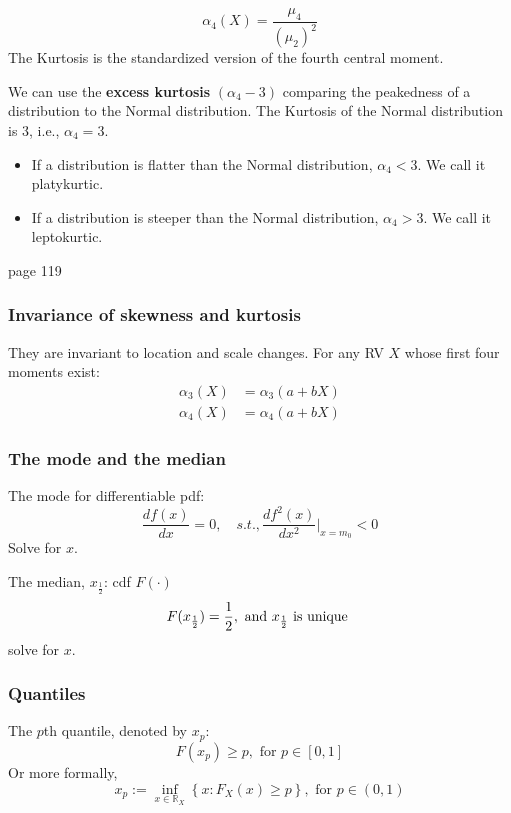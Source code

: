 \documentclass[12pt]{article}
\begin{document}
\begin{equation*}
\alpha_4(X) = \frac{\mu_4}{(\mu_2)^{2}}
\end{equation*}
The Kurtosis is the standardized version of the fourth central moment.

We can use the {\textbf {excess kurtosis}} $ (\alpha_4 - 3) $ comparing the peakedness
of a distribution to the Normal distribution.
The Kurtosis of the Normal distribution is 3, i.e., $ \alpha_4 = 3 $.


\begin{itemize}
\item If a distribution is flatter than the Normal distribution, $ \alpha_4 < 3 $.
We call it platykurtic.
\item If a distribution is steeper than the Normal distribution, $ \alpha_4 > 3 $.
We call it leptokurtic.
\end{itemize}
page 119


\subsubsection{Invariance of skewness and kurtosis}

They are invariant to location and scale changes.
For any RV $ X $ whose first four moments exist:
\begin{align*}
\alpha_3(X) &= \alpha_3(a + bX)\\
\alpha_4(X) &= \alpha_4(a + bX)
\end{align*}

\subsubsection{The mode and the median}

The mode for differentiable pdf:
\begin{equation*}
\frac{df(x)}{dx} = 0, \quad s.t., \frac{df^{2}(x)}{dx^{2}}\Bigg|_{x = m_0} < 0
\end{equation*}
Solve for $ x $.



The median, $ x_{\frac{1}{2}} $:
cdf $ F(\cdot ) $
\begin{equation*}
F(x_{\frac{1}{2}}) = \frac{1}{2}, \text{ and $ x_{\frac{1}{2}} $ is unique }
\end{equation*}
solve for $ x $.


\subsubsection{Quantiles}
The $ p $th quantile, denoted by $ x_{p} $:
\begin{equation*}
		F(x_{p}) \ge p, \text{ for } p \in [0,1]
\end{equation*}
Or more formally,
\begin{equation*}
x_{p} := \inf_{x \in \mathbb{R}_{X}}\left\{ x:F_{X}(x) \ge p  \right\} , \text{ for }
p \in (0,1)
\end{equation*}
\end{document}
